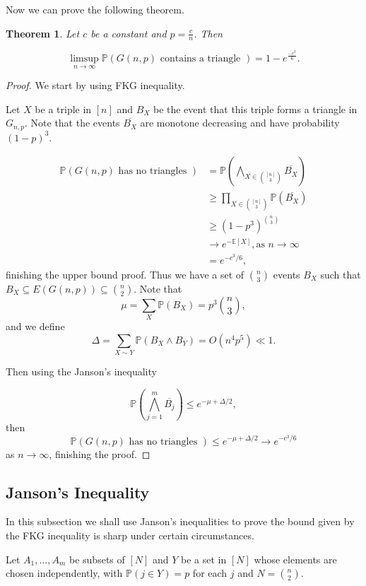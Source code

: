 \documentclass[12pt,twoside,a4paper,bibliography=totocnumbered]{book}
\numberwithin{equation}{section}
\newtheorem{theorem}             {Theorem}[section]
\theoremstyle{remark}
\begin{document}
Now we can prove the following theorem.

\begin{theorem} \label{theo:FKG}
Let $c$ be a constant and $p = \frac{c}{n}$. Then

$$ \limsup_{n \rightarrow \infty}\mathbb{P}(G(n,p)\text{ contains a triangle }) = 1 - e^{\frac{-c^3}{6}}.$$
\end{theorem}
\begin{proof}

We start by using FKG inequality.

Let $X$ be a triple in $[n]$ and $B_X$ be the event that this triple forms a triangle in $G_{n,p}$. Note that the events $\overline{B_X}$ are monotone decreasing and have probability $(1-p)^3$.

\begin{align*}
\mathbb{P}(G(n,p) \text{ has no triangles }) &= \mathbb{P}\left( \bigwedge_{X \in \binom{[n]}{3}} \overline{B_X}\right) \\
& \geq \prod_{X \in \binom{[n]}{3}} \mathbb{P}(\overline{B_X})\\
& \geq (1-p^3)^{\binom{n}{3}}\\
& \rightarrow e^{-\mathbb{E}[X]}, \text{as $n \rightarrow \infty$}\\
& = e^{-c^3/6},
\end{align*}
finishing the upper bound proof. Thus we have a set of $\binom{n}{3}$ events $B_X$ such that $B_X \subseteq E(G(n,p)) \subseteq \binom{n}{2}$.
Note that 
$$\mu = \sum_X \mathbb{P} (B_X) = p^3\binom {n}{3},$$
and we define
$$\Delta = \sum_{X\sim Y} \mathbb{P}(B_X \wedge B_Y) = O(n^4 p^5) \ll 1.$$

Then using the Janson's inequality 

$$ \mathbb{P}\left(\bigwedge_{j=1}^m \overline{B_j}\right) \leq e^{-\mu + \Delta/2}, $$
then
$$ \mathbb{P}(G(n,p)\text{ has no triangles }) \leq e^{-\mu + \Delta/2} \rightarrow e^{-c^3/6}$$
as $n \rightarrow \infty$, finishing the proof.
\end{proof}

\subsection{Janson's Inequality}

In this subsection we shall use Janson's inequalities to prove the bound given by the FKG inequality is sharp under certain circumstances.

Let $A_1, \ldots , A_m$ be subsets of $[N]$ and $Y$ be a set in $[N]$ whose elements are chosen independently, with $\mathbb{P}(j \in Y) = p$ for each $j$ and $N=\binom{n}{2}$. 
\end{document}
